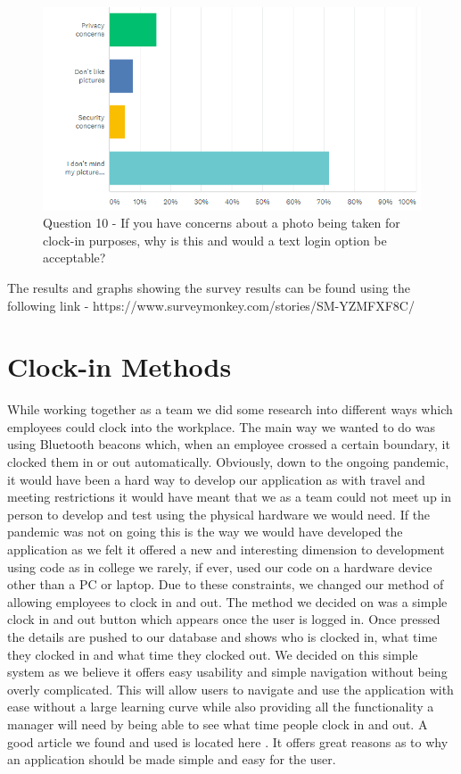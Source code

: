 \begin{figure}[h]
    \includegraphics[width=1\textwidth]{img/Q10.png}
    \caption{Question 10 - If you have concerns about a photo being taken for clock-in purposes, why is this and would a text login option be acceptable?}
    \label{fig}
\end{figure}


\break
\break
The results and graphs showing the survey results can be found using the following link - https://www.surveymonkey.com/stories/SM-YZMFXF8C/
\\
\section{Clock-in Methods}
While working together as a team we did some research into different ways which employees could clock into the workplace. The main way we wanted to do was using Bluetooth beacons which, when an employee crossed a certain boundary, it clocked them in or out automatically. Obviously, down to the ongoing pandemic, it would have been a hard way to develop our application as with travel and meeting restrictions it would have meant that we as a team could not meet up in person to develop and test using the physical hardware we would need. If the pandemic was not on going this is the way we would have developed the application as we felt it offered a new and interesting dimension to development using code as in college we rarely, if ever, used our code on a hardware device other than a PC or laptop.
Due to these constraints, we changed our method of allowing employees to clock in and out. The method we decided on was a simple clock in and out button which appears once the user is logged in. Once pressed the details are pushed to our database and shows who is clocked in, what time they clocked in and what time they clocked out. We decided on this simple system as we believe it offers easy usability and simple navigation without being overly complicated. This will allow users to navigate and use the application with ease without a large learning curve while also providing all the functionality a manager will need by being able to see what time people clock in and out. A good article we found and used is located here \cite{appNeeds}. It offers great reasons as to why an application should be made simple and easy for the user.
\\
